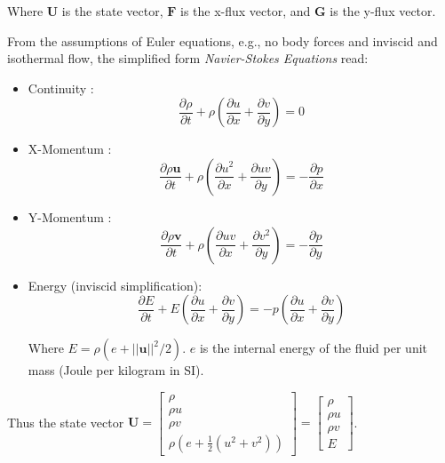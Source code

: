 \documentclass[11pt]{article}
\newcommand{\bm}{\boldsymbol}
\begin{document}
Where $\textbf{U}$ is the state vector, $\textbf{F}$ is the x-flux vector, and $\textbf{G}$ is the y-flux vector. 
\vspace{2.5mm}

From the assumptions of Euler equations, e.g., no body forces and inviscid and isothermal flow, the simplified form \textit{Navier-Stokes Equations} read:

\begin{itemize}
   \item Continuity : 
   \begin{equation}
       \frac{\partial \rho}{\partial t} + \rho \left(\frac{\partial u}{\partial x} + \frac{\partial v}{\partial y}\right) = 0 
   \end{equation}

   \item X-Momentum : 
   \begin{equation}
       \frac{\partial \rho \textbf{u}}{\partial t} + \rho \left(\frac{\partial u^{2}}{\partial x} + \frac{\partial uv}{\partial y}\right) = -\frac{\partial p}{\partial x}
   \end{equation}

   \item Y-Momentum : 
   \begin{equation}
       \frac{\partial \rho \textbf{v}}{\partial t} + \rho \left(\frac{\partial uv}{\partial x} + \frac{\partial v^2}{\partial y}\right) = -\frac{\partial p}{\partial y}
   \end{equation}

   \item Energy (inviscid simplification): 
   \begin{equation}
       \frac{\partial E}{\partial t} + E \left(\frac{\partial u}{\partial x} + \frac{\partial v}{\partial y}\right) = -p \left(\frac{\partial u}{\partial x} + \frac{\partial v}{\partial y}\right)
   \end{equation}

   Where \underline{$E = \rho (e + ||\bm{u}||^{2}/2)$}. $e$ is the internal energy of the fluid per unit mass (Joule per kilogram in SI).
\end{itemize}

Thus the state vector 
$\textbf{U} = 
\begin{bmatrix}
\rho \\[2mm]
\rho u \\[2mm]
\rho v \\[2mm]
\rho (e + \frac{1}{2}(u^{2}+v^{2}))    
\end{bmatrix} = \begin{bmatrix}
   \rho \\[2mm]
   \rho u \\[2mm]
   \rho v \\[2mm]
   E    
   \end{bmatrix}$.
\vspace{5mm}
\end{document}
